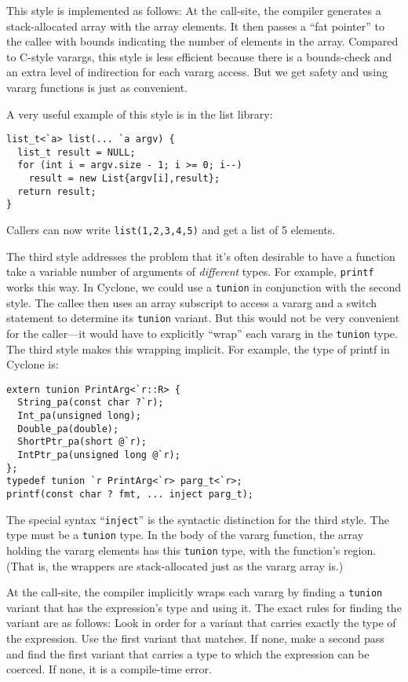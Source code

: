 This style is implemented as follows: At the call-site, the compiler
generates a stack-allocated array with the array elements.  It then
passes a ``fat pointer'' to the callee with bounds indicating the
number of elements in the array.  Compared to C-style varargs, this
style is less efficient because there is a bounds-check and an extra
level of indirection for each vararg access.  But we get safety and
using vararg functions is just as convenient.

A very useful example of this style is in the list library:
\begin{verbatim}
list_t<`a> list(... `a argv) {
  list_t result = NULL;
  for (int i = argv.size - 1; i >= 0; i--) 
    result = new List{argv[i],result};
  return result;
}
\end{verbatim}
Callers can now write \texttt{list(1,2,3,4,5)} and get a list of 5
elements.

The third style addresses the problem that it's often desirable to
have a function take a variable number of arguments of
\emph{different} types.  For example, \texttt{printf} works this way.
In Cyclone, we could use a \texttt{tunion} in conjunction with the
second style.  The callee then uses an array subscript to access a
vararg and a switch statement to determine its \texttt{tunion}
variant.  But this would not be very convenient for the caller---it
would have to explicitly ``wrap'' each vararg in the \texttt{tunion}
type.  The third style makes this wrapping implicit.  For example, the
type of printf in Cyclone is:

\begin{verbatim}
extern tunion PrintArg<`r::R> {
  String_pa(const char ?`r);
  Int_pa(unsigned long);
  Double_pa(double);
  ShortPtr_pa(short @`r);
  IntPtr_pa(unsigned long @`r);
};
typedef tunion `r PrintArg<`r> parg_t<`r>;
printf(const char ? fmt, ... inject parg_t);
\end{verbatim}

The special syntax ``\texttt{inject}'' is the syntactic distinction
for the third style.  The type must be a \texttt{tunion} type.  In the
body of the vararg function, the array holding the vararg elements has
this \texttt{tunion} type, with the function's region.  (That is, the
wrappers are stack-allocated just as the vararg array is.)

At the call-site, the compiler implicitly wraps each vararg by finding
a \texttt{tunion} variant that has the expression's type and using
it.  The exact rules for finding the variant are as follows:  Look in
order for a variant that carries exactly the type of the expression.
Use the first variant that matches.  If none, make a second pass and
find the first variant that carries a type to which the expression can
be coerced.  If none, it is a compile-time error.

